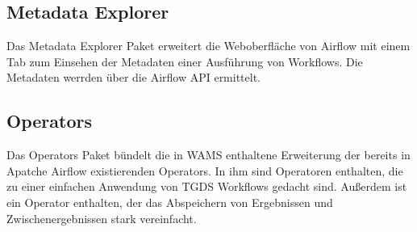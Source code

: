 \subsection{Metadata Explorer}
Das Metadata Explorer Paket erweitert die Weboberfläche von Airflow mit einem Tab zum Einsehen der Metadaten einer Ausführung von Workflows. Die Metadaten werrden über die Airflow API ermittelt.

\subsection{Operators}
Das Operators Paket bündelt die in WAMS enthaltene Erweiterung der bereits in Apatche Airflow existierenden Operators. 
In ihm sind Operatoren enthalten, die zu einer einfachen Anwendung von TGDS Workflows gedacht sind.
Außerdem ist ein Operator enthalten, der das Abspeichern von Ergebnissen und Zwischenergebnissen stark vereinfacht.